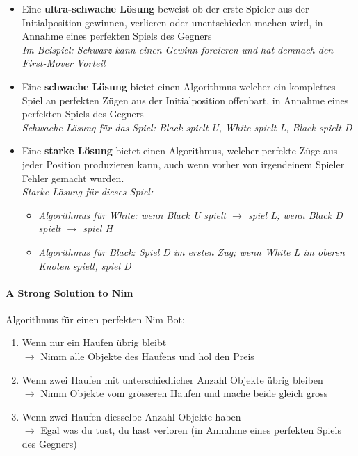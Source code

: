 \documentclass[a4paper]{article}
\begin{document}
		\begin{itemize}
			\item Eine \textbf{ultra-schwache Lösung} beweist ob der erste Spieler aus der Initialposition gewinnen, verlieren oder unentschieden machen wird, in Annahme eines perfekten Spiels des Gegners \\
			\textit{Im Beispiel: Schwarz kann einen Gewinn forcieren und hat demnach den First-Mover Vorteil}
			
			\item Eine \textbf{schwache Lösung} bietet einen Algorithmus welcher ein komplettes Spiel an perfekten Zügen aus der Initialposition offenbart, in Annahme eines perfekten Spiels des Gegners \\
			\textit{Schwache Lösung für das Spiel: Black spielt U, White spielt L, Black spielt D}
			
			\item Eine \textbf{starke Lösung} bietet einen Algorithmus, welcher perfekte Züge aus jeder Position produzieren kann, auch wenn vorher von irgendeinem Spieler Fehler gemacht wurden. \\
			\textit{Starke Lösung für dieses Spiel:}
				\begin{itemize}
					\item \textit{Algorithmus für White: wenn Black U spielt $\rightarrow$ spiel L; wenn Black D spielt $\rightarrow$ spiel H}
					\item \textit{Algorithmus für Black: Spiel D im ersten Zug; wenn White L im oberen Knoten spielt, spiel D}
				\end{itemize}
		\end{itemize}
	
		\paragraph{A Strong Solution to Nim}
		
		
		
		Algorithmus für einen perfekten Nim Bot:
		
		\begin{enumerate}
			\item Wenn nur ein Haufen übrig bleibt \\
				$\rightarrow$ Nimm alle Objekte des Haufens und hol den Preis
			\item Wenn zwei Haufen mit unterschiedlicher Anzahl Objekte übrig bleiben \\
				$\rightarrow$ Nimm Objekte vom grösseren Haufen und mache beide gleich gross
			\item Wenn zwei Haufen diesselbe Anzahl Objekte haben \\
				$\rightarrow$ Egal was du tust, du hast verloren (in Annahme eines perfekten Spiels des Gegners)
		\end{enumerate} 
	
\end{document}
